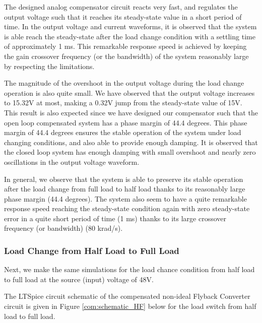 The designed analog compensator circuit reacts very fast, and regulates the output voltage such that it reaches its steady-state value in a short period of time. In the output voltage and current waveforms, it is observed that the system is able reach the steady-state after the load change condition with a settling time of approximately 1 ms. This remarkable response speed is achieved by keeping the gain crossover frequency (or the bandwidth) of the system reasonably large by respecting the limitations.

The magnitude of the overshoot in the output voltage during the load change operation is also quite small. We have observed that the output voltage increases to 15.32V at most, making a 0.32V jump from the steady-state value of 15V. This result is also expected since we have designed our compensator such that the open loop compensated system has a phase margin of 44.4 degrees. This phase margin of 44.4 degrees ensures the stable operation of the system under load changing conditions, and also able to provide enough damping. It is observed that the closed loop system has enough damping with small overshoot and nearly zero oscillations in the output voltage waveform.

In general, we observe that the system is able to preserve its stable operation after the load change from full load to half load thanks to its reasonably large phase margin (44.4 degrees). The system also seem to have a quite remarkable response speed reaching the steady-state condition again with zero steady-state error in a quite short period of time (1 ms) thanks to its large crossover frequency (or bandwidth) (80 krad/s).

\subsubsection{Load Change from Half Load to Full Load}

Next, we make the same simulations for the load chance condition from half load to full load at the source (input) voltage of 48V.

The LTSpice circuit schematic of the compensated non-ideal Flyback Converter circuit is given in Figure \ref{com:schematic_HF} below for the load switch from half load to full load.

